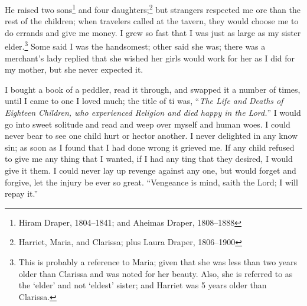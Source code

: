 He raised two sons\footnote{Hiram Draper, 1804--1841; and Aheimas Draper, 1808--1888} and four daughters;\footnote{Harriet, Maria, and Clarissa; plus Laura Draper, 1806--1900} but strangers respected me ore than the rest of the children; when travelers called at the tavern, they would choose me to do errands and give me money.
I grew so fast that I was just as large as my sister elder.\footnote{This is probably a reference to Maria; given that she was less than two years older than Clarissa and was noted for her beauty. Also, she is referred to as the `elder' and not `eldest' sister; and Harriet was 5 years older than Clarissa.}
Some said I was the handsomest; other said she was; there was a merchant's lady replied that she wished her girls would work for her as I did for my mother, but she never expected it.

I bought a book of a peddler, read it through, and swapped it a number of times, until I came to one I loved much; the title of ti was, ``\textit{The Life and Deaths of Eighteen Children, who experienced Religion and died happy in the Lord.}''
I would go into sweet solitude and read and weep over myself and human woes.
I could never bear to see one child hurt or hector another.
I never delighted in any know sin; as soon as I found that I had done wrong it grieved me.
If any child refused to give me any thing that I wanted, if I had any ting that they desired, I would give it them.
I could never lay up revenge against any one, but would forget and forgive, let the injury be ever so great.
``Vengeance is mind, saith the Lord; I will repay it.''

